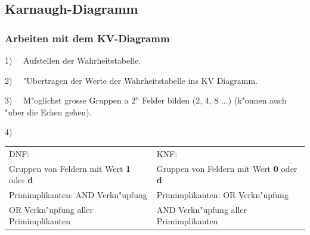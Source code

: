\subsection{Karnaugh-Diagramm}
	\subsubsection{Arbeiten mit dem KV-Diagramm}
\begin{compactitem}
	\item 1) \ \ Aufstellen der Wahrheitstabelle.\\
	\item 2) \ \ "Ubertragen der Werte der Wahrheitstabelle ins KV Diagramm.\\
	\item 3) \ \ M"oglichst grosse Gruppen a $2^n$ Felder bilden (2, 4, 8 ...) (k"onnen auch "uber die Ecken gehen).\\
	\item 4)
	\begin{tabular}{ll}
		DNF: & KNF: \\
		Gruppen von Feldern mit Wert \textbf{1} oder \textbf{d} & Gruppen von Feldern mit Wert \textbf{0} oder \textbf{d}\\
		Primimplikanten: AND Verkn"upfung & Primimplikanten: OR Verkn"upfung\\
		OR Verkn"upfung aller Primimplikanten & AND Verkn"upfung aller Primimplikanten\\
	\end{tabular}
\end{compactitem}

